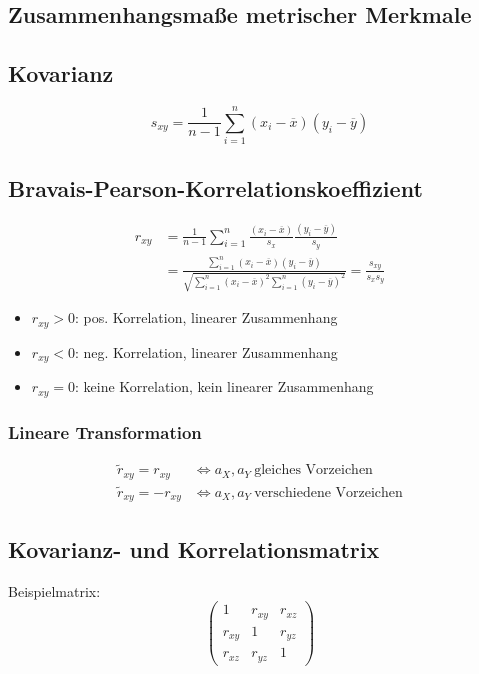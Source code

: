 \documentclass[10pt,a4paper,landscape]{article}
\begin{document}
\begin{multicols}{4}
\section{Zusammenhangsmaße metrischer Merkmale}

\subsection{Kovarianz}
\[
s_{xy} = \frac{1}{n-1} \sum_{i=1}^n(x_i - \overline{x})(y_i - \overline{y})
\]

\subsection{Bravais-Pearson-Korrelationskoeffizient}
\begin{align*}
r_{xy} &= \frac{1}{n-1}\sum_{i=1}^n \frac{(x_i - \overline{x})}{s_x} \frac{(y_i - \overline{y})}{s_y} \\
&= \frac{\sum_{i=1}^n(x_i - \overline{x})(y_i - \overline{y})}{\sqrt{\sum_{i=1}^n(x_i - \overline{x})^2 \sum_{i=1}^n(y_i - \overline{y})^2}} = \frac{s_{xy}}{s_xs_y}
\end{align*}

\begin{itemize}
\item $r_{xy}>0$: pos. Korrelation, linearer Zusammenhang
\item $r_{xy}<0$: neg. Korrelation, linearer Zusammenhang
\item $r_{xy}=0$: keine Korrelation, kein linearer Zusammenhang 
\end{itemize}

\subsubsection*{Lineare Transformation}
\begin{align*}
\tilde{r}_{xy}=r_{xy} &\Leftrightarrow a_X, a_Y ~\text{gleiches Vorzeichen} \\
\tilde{r}_{xy}=-r_{xy} &\Leftrightarrow a_X,a_Y ~\text{verschiedene Vorzeichen}
\end{align*}

\subsection{Kovarianz- und Korrelationsmatrix}
Beispielmatrix:
\[
\begin{pmatrix}
1 & r_{xy} & r_{xz} \\
r_{xy} & 1 & r_{yz} \\
r_{xz} & r_{yz} & 1
\end{pmatrix}
\]


\end{multicols}
\end{document}
